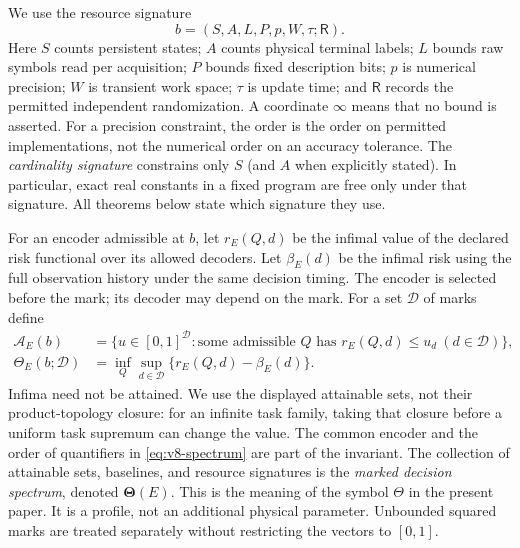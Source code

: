 We use the resource signature
\begin{equation}
 b=(S,A,L,P,p,W,\tau;\mathsf R).                       \label{eq:v8-signature}
\end{equation}
Here $S$ counts persistent states; $A$ counts physical terminal labels;
$L$ bounds raw symbols read per acquisition; $P$ bounds fixed description
bits; $p$ is numerical precision; $W$ is transient work space; $\tau$ is
update time; and $\mathsf R$ records the permitted independent
randomization. A coordinate $\infty$ means that no bound is asserted.
For a precision constraint, the order is the order on permitted
implementations, not the numerical order on an accuracy tolerance.
The \emph{cardinality signature} constrains only $S$ (and $A$ when
explicitly stated). In particular, exact real constants in a fixed
program are free only under that signature. All theorems below state
which signature they use.

For an encoder admissible at $b$, let $r_E(Q,d)$ be the infimal value of
the declared risk functional over its allowed decoders. Let $\beta_E(d)$ be the infimal risk using the full
observation history under the same decision timing. The encoder is
selected before the mark; its decoder may depend on the mark. For a set
$\mathcal D$ of marks define
\begin{align}
 \mathscr A_E(b)&=\{u\in[0,1]^{\mathcal D}:\text{some admissible }Q
                  \text{ has }r_E(Q,d)\le u_d\ (d\in\mathcal D)\},
                                                               \label{eq:v8-riskset}\\
 \Theta_E(b;\mathcal D)&=\inf_Q\sup_{d\in\mathcal D}
                         \{r_E(Q,d)-\beta_E(d)\}.       \label{eq:v8-spectrum}
\end{align}
Infima need not be attained. We use the displayed attainable sets, not
their product-topology closure: for an infinite task family, taking that
closure before a uniform task supremum can change the value. The common
encoder and the order of quantifiers in \eqref{eq:v8-spectrum} are part
of the invariant.
The collection of attainable sets, baselines, and resource signatures is
the \emph{marked decision spectrum}, denoted $\boldsymbol\Theta(E)$.
This is the meaning of the symbol $\Theta$ in the present paper. It is a
profile, not an additional physical parameter. Unbounded squared marks
are treated separately without restricting the vectors to $[0,1]$.

